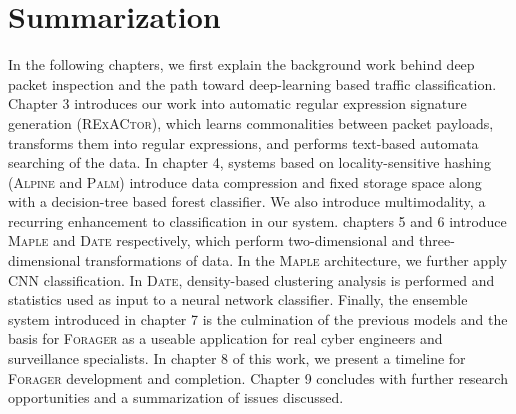 \section{Summarization}

In the following chapters, we first explain the background work behind deep packet inspection and the path toward deep-learning based traffic classification. Chapter 3 introduces our work into automatic regular expression signature generation (\textsc{RExACtor}), which learns commonalities between packet payloads, transforms them into regular expressions, and performs text-based automata searching of the data. In chapter 4, systems based on locality-sensitive hashing (\textsc{Alpine} and \textsc{Palm}) introduce data compression and fixed storage space along with a decision-tree based forest classifier. We also introduce multimodality, a recurring enhancement to classification in our system. chapters 5 and 6 introduce \textsc{Maple} and \textsc{Date} respectively, which perform two-dimensional and three-dimensional transformations of data. In the \textsc{Maple} architecture, we further apply CNN classification. In \textsc{Date}, density-based clustering analysis is performed and statistics used as input to a neural network classifier. Finally, the ensemble system introduced in chapter 7 is the culmination of the previous models and the basis for \textsc{Forager} as a useable application for real cyber engineers and surveillance specialists. In chapter 8 of this work, we present a timeline for \textsc{Forager} development and completion. Chapter 9 concludes with further research opportunities and a summarization of issues discussed.
